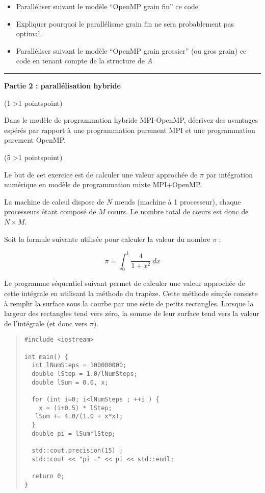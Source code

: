 \documentclass[12pt]{report}
\def\Frac#1#2{\frac{\displaystyle #1}{\displaystyle #2}}
\newcounter{cptPoints}
\newcounter{cptQuestions}
\newcommand\question[2]{\bigskip\par\addtocounter{cptQuestions}{1}\addtocounter{cptPoints}{#2}{\bf Question #1 n\textsuperscript{o} \thecptQuestions} (#2 \ifnum #2>1 points\else point\fi)\par}
\begin{document}
\begin{itemize}
		\item Parall\'eliser suivant le mod\`ele ``OpenMP grain fin'' ce code
		\item Expliquer pourquoi le parall\'elisme grain fin ne sera probablement pas optimal.  
		\item Parall\'eliser suivant le mod\`ele ``OpenMP grain grossier'' (ou gros grain) ce code en tenant compte de la structure de $A$
	\end{itemize}


\bigskip

\hrule
\medskip

{\bf Partie 2 : parallélisation hybride}
\medskip

\question{de cours}1
\medskip

Dans le mod\`ele de programmation hybride MPI-OpenMP, d\'ecrivez des avantages esp\'er\'es par rapport \`a une programmation purement MPI et une programmation purement OpenMP. 

\question{}5
\medskip

Le but de cet exercice est de calculer une valeur approch\'ee de $\pi$ par int\'egration num\'erique en mod\`ele de programmation mixte MPI+OpenMP.
\medskip

La machine de calcul dispose de $N$ n\oe uds (machine à 1 processeur), chaque processeurs \'etant compos\'e de $M$ c\oe urs. Le nombre total de c\oe urs est donc de $N\times M$.
\medskip

Soit la formule suivante utilis\'ee pour calculer la valeur du nombre $\pi$ :

$$
\pi = \int^1_0 \Frac{4}{1+x^2}\ dx
$$

Le programme s\'equentiel suivant permet de calculer une valeur approch\'ee de cette int\'egrale en utilisant la m\'ethode du trap\`eze. Cette m\'ethode simple consiste \`a remplir la surface sous la courbe par une s\'erie de petits rectangles. Lorsque la largeur des rectangles tend vers z\'ero, la somme de leur surface tend vers la valeur de l'int\'egrale (et donc vers $\pi$). 

\begin{quote}
\begin{lstlisting}
#include <iostream>

int main() {
  int lNumSteps = 100000000;
  double lStep = 1.0/lNumSteps;
  double lSum = 0.0, x;

  for (int i=0; i<lNumSteps ; ++i ) {
    x = (i+0.5) * lStep;
   lSum += 4.0/(1.0 + x*x);
  }
  double pi = lSum*lStep;

  std::cout.precision(15) ;
  std::cout << "pi =" << pi << std::endl;

  return 0;
}
\end{lstlisting}
\end{quote}
\end{document}
